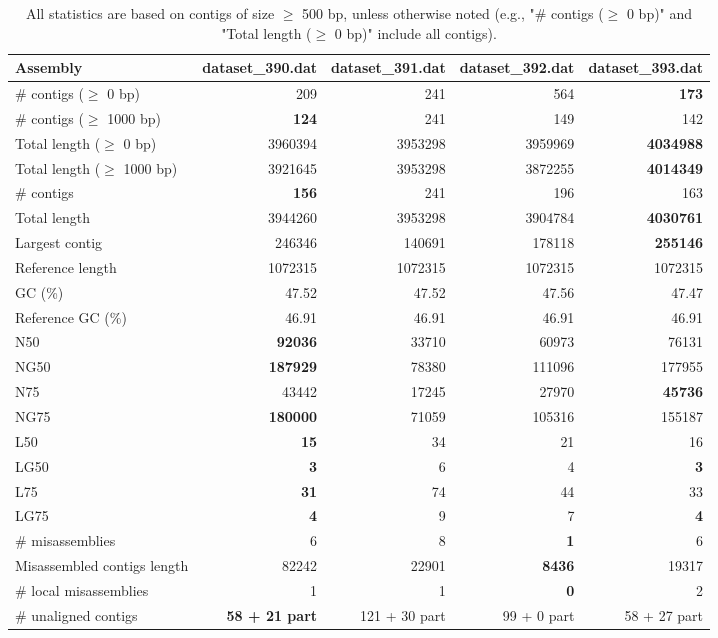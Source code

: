 \documentclass[12pt,a4paper]{article}
\begin{document}
\begin{table}[ht]
\begin{center}
\caption{All statistics are based on contigs of size $\geq$ 500 bp, unless otherwise noted (e.g., "\# contigs ($\geq$ 0 bp)" and "Total length ($\geq$ 0 bp)" include all contigs).}
\begin{tabular}{|l*{4}{|r}|}
\hline
Assembly & dataset\_390.dat & dataset\_391.dat & dataset\_392.dat & dataset\_393.dat \\ \hline
\# contigs ($\geq$ 0 bp) & 209 & 241 & 564 & {\bf 173} \\ \hline
\# contigs ($\geq$ 1000 bp) & {\bf 124} & 241 & 149 & 142 \\ \hline
Total length ($\geq$ 0 bp) & 3960394 & 3953298 & 3959969 & {\bf 4034988} \\ \hline
Total length ($\geq$ 1000 bp) & 3921645 & 3953298 & 3872255 & {\bf 4014349} \\ \hline
\# contigs & {\bf 156} & 241 & 196 & 163 \\ \hline
Total length & 3944260 & 3953298 & 3904784 & {\bf 4030761} \\ \hline
Largest contig & 246346 & 140691 & 178118 & {\bf 255146} \\ \hline
Reference length & 1072315 & 1072315 & 1072315 & 1072315 \\ \hline
GC (\%) & 47.52 & 47.52 & 47.56 & 47.47 \\ \hline
Reference GC (\%) & 46.91 & 46.91 & 46.91 & 46.91 \\ \hline
N50 & {\bf 92036} & 33710 & 60973 & 76131 \\ \hline
NG50 & {\bf 187929} & 78380 & 111096 & 177955 \\ \hline
N75 & 43442 & 17245 & 27970 & {\bf 45736} \\ \hline
NG75 & {\bf 180000} & 71059 & 105316 & 155187 \\ \hline
L50 & {\bf 15} & 34 & 21 & 16 \\ \hline
LG50 & {\bf 3} & 6 & 4 & {\bf 3} \\ \hline
L75 & {\bf 31} & 74 & 44 & 33 \\ \hline
LG75 & {\bf 4} & 9 & 7 & {\bf 4} \\ \hline
\# misassemblies & 6 & 8 & {\bf 1} & 6 \\ \hline
Misassembled contigs length & 82242 & 22901 & {\bf 8436} & 19317 \\ \hline
\# local misassemblies & 1 & 1 & {\bf 0} & 2 \\ \hline
\# unaligned contigs & {\bf 58 + 21 part} & 121 + 30 part & 99 + 0 part & 58 + 27 part \\ \hline

\end{tabular}
\end{center}
\end{table}
\end{document}
